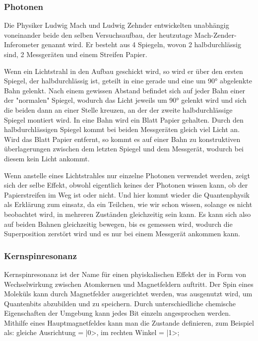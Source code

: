 \subsubsection{Photonen}

Die Physiker Ludwig Mach und Ludwig Zehnder entwickelten unabhängig voneinander beide den selben Versuchsaufbau, der heutzutage Mach-Zender-Inferometer genannt wird. Er besteht aus 4 Spiegeln, wovon 2 halbdurchlässig sind, 2 Messgeräten und einem Streifen Papier.

Wenn ein Lichtstrahl in den Aufbau geschickt wird, so wird er über den ersten Spiegel, der halbdurchlässig ist, geteilt in eine gerade und eine um 90° abgelenkte Bahn gelenkt. Nach einem gewissen Abstand befindet sich auf jeder Bahn einer der "normalen" Spiegel, wodurch das Licht jeweils um 90° gelenkt wird und sich die beiden dann an einer Stelle kreuzen, an der der zweite halbdurchlässige Spiegel montiert wird. In eine Bahn wird ein Blatt Papier gehalten. Durch den halbdurchlässigen Spiegel kommt bei beiden Messgeräten gleich viel Licht an. Wird das Blatt Papier entfernt, so kommt es auf einer Bahn zu konstruktiven überlagerungen zwischen dem letzten Spiegel und dem Messgerät, wodurch bei diesem kein Licht ankommt.

Wenn anstelle eines Lichtstrahles nur einzelne Photonen verwendet werden, zeigt sich der selbe Effekt, obwohl eigentlich keines der Photonen wissen kann, ob der Papierstreifen im Weg ist oder nicht. Und hier kommt wieder die Quantenphysik als Erklärung zum einsatz, da ein Teilchen, wie wir schon wissen, solange es nicht beobachtet wird, in mehreren Zuständen gleichzeitig sein kann. Es kann sich also auf beiden Bahnen gleichzeitig bewegen, bis es gemessen wird, wodurch die Superposition zerstört wird und es nur bei einem Messgerät ankommen kann.

\subsubsection{Kernspinresonanz}

Kernspinresonanz ist der Name für einen phyiskalischen Effekt der in Form von Wechselwirkung zwischen Atomkernen und Magnetfeldern auftritt. Der Spin eines Moleküls kann durch Magnetfelder ausgerichtet werden, was ausgenutzt wird, um Quantenbits abzubilden und zu speichern. Durch unterschiedliche chemische Eigenschaften der Umgebung kann jedes Bit einzeln angesprochen werden. Mithilfe eines Hauptmagnetfeldes kann man die Zustande definieren, zum Beispiel als: gleiche Ausrichtung = |0>, im rechten Winkel = |1>;

